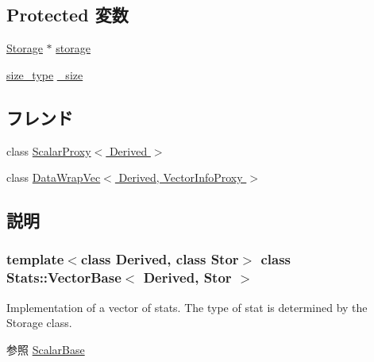 \subsection*{Protected 変数}
\begin{DoxyCompactItemize}
\item 
\hyperlink{classStats_1_1VectorBase_a5d4a6db0e7c32292f54a08d05c671bd1}{Storage} $\ast$ \hyperlink{classStats_1_1VectorBase_a1b410f65a3077609e9b1902c52136304}{storage}
\item 
\hyperlink{namespaceStats_ada51e68d31936547d3729c82daf6b7c6}{size\_\-type} \hyperlink{classStats_1_1VectorBase_a9f1927ae81f20205d93e0b86915f27d7}{\_\-size}
\end{DoxyCompactItemize}
\subsection*{フレンド}
\begin{DoxyCompactItemize}
\item 
class \hyperlink{classStats_1_1VectorBase_a339d5293ff5abbd173dd47aa666bb3c4}{ScalarProxy$<$ Derived $>$}
\item 
class \hyperlink{classStats_1_1VectorBase_abc1eabc978bf7f6f598c8c16411b22f2}{DataWrapVec$<$ Derived, VectorInfoProxy $>$}
\end{DoxyCompactItemize}


\subsection{説明}
\subsubsection*{template$<$class Derived, class Stor$>$ class Stats::VectorBase$<$ Derived, Stor $>$}

Implementation of a vector of stats. The type of stat is determined by the Storage class. \begin{DoxySeeAlso}{参照}
\hyperlink{classStats_1_1ScalarBase}{ScalarBase} 
\end{DoxySeeAlso}


